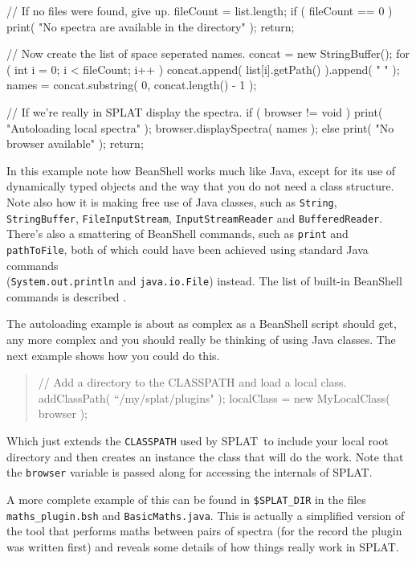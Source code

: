 \documentclass[twoside,11pt,nolof]{starlink}
\providecommand{\SPLAT}{\textsf{SPLAT}}
\providecommand{\hitext}[1]{\texttt{#1}}
\begin{document}
\begin{terminalv}
{    // If no files were found, give up.
    fileCount = list.length;
    if ( fileCount == 0 ) {
        print( "No spectra are available in the directory" );
        return;
    }

    // Now create the list of space seperated names.
    concat = new StringBuffer();
    for ( int i = 0; i < fileCount; i++ ) {
        concat.append( list[i].getPath() ).append( " " );
    }
    names = concat.substring( 0, concat.length() - 1 );
}

// If we're really in SPLAT display the spectra.
if ( browser != void ) {
    print( "Autoloading local spectra" );
    browser.displaySpectra( names );
} else {
    print( "No browser available" );
}
return;
\end{terminalv}

In this example note how BeanShell works much like Java, except for
its use of dynamically typed objects and the way that you do not need
a class structure. Note also how it is making free use of Java
classes, such as \hitext{String}, \hitext{StringBuffer},
\hitext{FileInputStream}, \hitext{InputStreamReader} and
\hitext{BufferedReader}. There's also a smattering of BeanShell
commands, such as \hitext{print} and \hitext{pathToFile}, both of
which could have been achieved using standard Java commands \\
(\hitext{System.out.println} and \hitext{java.io.File})
instead. The list of built-in BeanShell commands is described
{}.

The autoloading example is about as complex as a BeanShell script
should get, any more complex and you should really be thinking of
using Java classes. The next example shows how you could do this.
\begin{quote}
\begin{terminalv}
//  Add a directory to the CLASSPATH and load a local class.
addClassPath( ``/my/splat/plugins" );
localClass = new MyLocalClass( browser );
\end{terminalv}
\end{quote}
Which just extends the \hitext{CLASSPATH} used by \SPLAT\ to include
your local root directory and then creates an instance the class that
will do the work. Note that the \hitext{browser} variable is passed
along for accessing the internals of \SPLAT.

A more complete example of this can be found in
\hitext{\$SPLAT\_DIR} in the files \hitext{maths\_plugin.bsh} and
\hitext{BasicMaths.java}. This is actually a simplified version of the
tool that performs maths between pairs of spectra (for the record the
plugin was written first) and reveals some details of how things
really work in \SPLAT.
\end{document}
